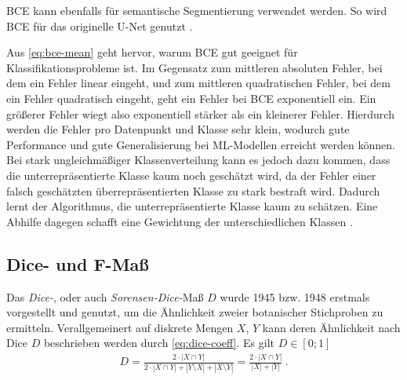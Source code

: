 \acf{BCE} kann ebenfalls für semantische Segmentierung verwendet werden. So wird \acf{BCE} 
für das originelle U-Net genutzt \cite{Ronneberger.18052015}. 

Aus \autoref{eq:bce-mean} geht hervor, warum \ac{BCE} gut geeignet für Klassifikationsprobleme ist.
Im Gegensatz zum mittleren absoluten Fehler, bei dem ein Fehler linear eingeht, und zum mittleren quadratischen Fehler,
bei dem ein Fehler quadratisch eingeht, geht ein Fehler bei \ac{BCE} exponentiell ein. 
Ein größerer Fehler wiegt also exponentiell stärker als ein kleinerer Fehler. 
Hierdurch werden die Fehler pro Datenpunkt und Klasse sehr klein, 
wodurch gute Performance und gute Generalisierung bei \ac{ML}-Modellen erreicht werden können. \\

Bei stark ungleichmäßiger Klassenverteilung kann es jedoch dazu kommen, 
dass die unterrepräsentierte Klasse kaum noch geschätzt wird, 
da der Fehler einer falsch geschätzten überrepräsentierten Klasse zu stark bestraft wird.
Dadurch lernt der Algorithmus, die unterrepräsentierte Klasse kaum zu schätzen.
Eine Abhilfe dagegen schafft eine Gewichtung der unterschiedlichen Klassen \cite{Ronneberger.18052015}.

\subsection{Dice- und F-Maß}

Das \textit{Dice-}, oder auch \textit{Sorensen-Dice-}Maß $D$ wurde 1945 bzw. 1948 erstmals vorgestellt und genutzt, um die Ähnlichkeit zweier botanischer Stichproben zu ermitteln. Verallgemeinert auf diskrete Mengen $X$, $Y$ kann deren Ähnlichkeit nach Dice $D$ beschrieben werden durch \autoref{eq:dice-coeff}. Es gilt $D \in [0; 1]$ \cites{Srenson.1948}{Dice.1945} 
\begin{align}
	\label{eq:dice-coeff} D = \frac{2 \cdot | X \cap Y |}{2 \cdot | X \cap Y | + |Y \setminus X| + |X \setminus Y|} 
	=\frac{2 \cdot | X \cap Y |}{|X| + |Y|} ~.
\end{align} 

